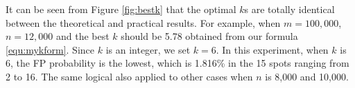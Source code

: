 It can be seen from Figure \ref{fig:bestk} that the optimal $k$s are totally identical between the theoretical and practical results. For example, when $m=100,000$, $n=12,000$ and the best $k$ should be 5.78 obtained from our formula \ref{equ:mykform}. Since $k$ is an integer, we set $k=6$. In this experiment, when $k$ is 6, the FP probability is the lowest, which is 1.816\% in the 15 spots ranging from 2 to 16. The same logical also applied to other cases when $n$ is 8,000 and 10,000.











